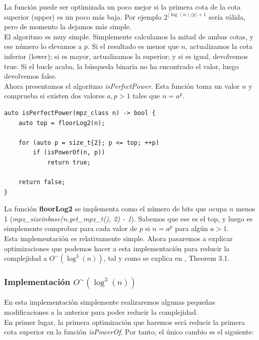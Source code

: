 La función puede ser optimizada un poco mejor si la primera cota de la cota superior (upper) es un poco más baja. Por ejemplo $2^{\lfloor \log(n)/p \rfloor + 1}$ sería válida, pero de momento la dejamos más simple.\\

El algoritmo es muy simple. Simplemente calculamos la mitad de ambas cotas, y ese número lo elevamos a $p$. Si el resultado es menor que $n$, actualizamos la cota inferior (lower); si es mayor, actualizamos la superior; y si es igual, devolvemos true. Si el bucle acaba, la búsqueda binaria no ha encontrado el valor, luego devolvemos false.\\

Ahora presentamos el algoritmo \textit{isPerfectPower}. Esta función toma un valor $n$ y comprueba si existen dos valores $a, p > 1$ tales que $n = a^p$.\\

\begin{lstlisting}
auto isPerfectPower(mpz_class n) -> bool {
	auto top = floorLog2(n);

	for (auto p = size_t{2}; p <= top; ++p)
		if (isPowerOf(n, p))
			return true;

	return false;
}
\end{lstlisting}

La función \textbf{floorLog2} se implementa como el número de bits que ocupa $n$ menos 1 (\textit{mpz\_sizeinbase(n.get\_mpz\_t(), 2) - 1}). Sabemos que ese es el top, y luego es simplemente comprobar para cada valor de $p$ si $n = a^p$ para algún $a > 1$.\\

Esta implementación es relativamente simple. Ahora pasaremos a explicar optimizaciones que podemos hacer a esta implementación para reducir la complejidad a $O^\sim(\log^3(n))$, tal y como se explica en \cite{bach_sorenson_1989}, Theorem 3.1.

\subsubsection{Implementación $O^\sim(\log^3(n))$}

En esta implementación simplemente realizaremos algunas pequeñas modificaciones a la anterior para poder reducir la complejidad.\\

En primer lugar, la primera optimización que haremos será reducir la primera cota superior en la función \textit{isPowerOf}. Por tanto, el único cambio es el siguiente:\\

